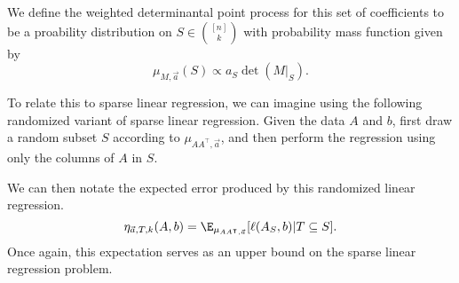 We define the weighted determinantal point process for this set of coefficients to be a proability distribution on $S \in \binom{[n]}{k}$ with probability mass function given by
\[
    \mu_{M, \vec{a}}(S) \propto a_S \det(M|_S).
\]

To relate this to sparse linear regression, we can imagine using the following randomized variant of sparse linear regression.
Given the data $A$ and $b$, first draw a random subset $S$ according to $\mu_{AA^{\intercal}, \vec{a}}$, and then perform the regression using only the columns of $A$ in $S$.

We can then notate the expected error produced by this randomized linear regression.
\[
    \eta_{\vec{a}, T, k}(A,b) = \E_{\mu_{AA^{\intercal},\vec{a}}} [\ell(A_S, b) | T \subseteq S].
\]
Once again, this expectation serves as an upper bound on the sparse linear regression problem.

